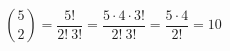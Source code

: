$$\binom{5}{2} = \frac{5!}{2! \ 3!} = \frac{5 \cdot 4 \cdot 3!}{2! \ 3!} = \frac{5 \cdot 4}{2!} = 10$$